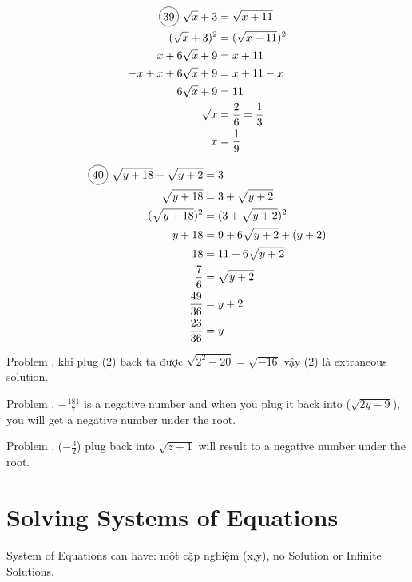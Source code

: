 \begin{multicols}{2}
\begin{align*}
  \circled{39}\ \sqrt{x}+3&=\sqrt{x+11}\\
  (\sqrt{x}+3)^{2}&=(\sqrt{x+11})^{2}\\
  x+6\sqrt{x}+9&=x+11\\
  -x+x+6\sqrt{x}+9&=x+11-x\\
  6\sqrt{x}+9&=11\\
  \sqrt{x}&=\frac{2}{6}=\frac{1}{3}\\
  x&=\frac{1}{9}\\
\end{align*}

\begin{align*}
  \circled{40}\ \sqrt{y+18}-\sqrt{y+2}&=3\\
  \sqrt{y+18}&=3+\sqrt{y+2}\\
  (\sqrt{y+18})^{2}&=(3+\sqrt{y+2})^{2}\\
  y+18&=9+6\sqrt{y+2}+(y+2)\\
  18&=11+6\sqrt{y+2}\\
  \frac{7}{6}&=\sqrt{y+2}\\
  \frac{49}{36}&=y+2\\
  -\frac{23}{36}&=y\\
\end{align*}
\end{multicols}

Problem , khi plug (2) back ta được $\sqrt{2^{2}-20}=\sqrt{-16}$ vậy (2) là extraneous solution.

Problem , $-\frac{181}{7}$ is a negative number and when you plug it back into ($\sqrt{2y-9}$), you will get a negative number under the root.

Problem , ($-\frac{3}{2}$) plug back into $\sqrt{z+1}$ will result to a negative number under the root.

\section{Solving Systems of Equations}

%
%

System of Equations can have: một cặp nghiệm (x,y), no Solution or Infinite Solutions.

\vspace{.4cm}

